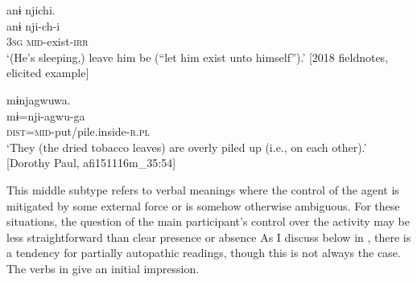 \documentclass[output=paper]{langscibook}
\begin{document}
\ea\label{ex:brooks:30}
\glll anɨ  njichi.\\
anɨ  nji-ch-i\\
\textsc{3sg}  \textsc{mid-}exist-\textsc{irr}\\
\glt `(He’s sleeping,) leave him be (“let him exist unto himself”).'
[2018 fieldnotes, elicited example]
\z


\ea\label{ex:brooks:31}
\glll mɨnjagwuwa.\\
 mɨ=nji-agwu-ga\\
\textsc{dist=mid-}put/pile.inside-\textsc{r.pl}\\
\glt `They (the dried tobacco leaves) are overly piled up (i.e., on each other).'
[Dorothy Paul, afi151116m\_35:54]
\z


\label{sec:brooks:4.2.1.3}

This middle subtype refers to verbal meanings where the control of the agent is mitigated by some external force or is somehow otherwise ambiguous. For these situations, the question of the main participant’s control over the activity may be less straightforward than clear presence  or absence  As I discuss below in , there is a tendency for partially autopathic readings, though this is not always the case. The verbs in  give an initial impression.
\end{document}
